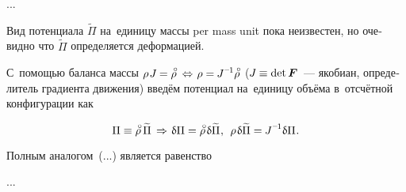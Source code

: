 ...

\begin{otherlanguage}{russian}

Вид потенциала ${\widetilde{\Pi}}$ на~единицу \hbox{массы} per mass unit пока неизвестен, но очевидно что ${\widetilde{\Pi}}$ определяется деформацией.

С~помощью баланса массы ${\rho \hspace{.2ex} J \hspace{-0.1ex} = \mathcircabove{\rho} \hspace{.5ex} \Leftrightarrow \hspace{.2ex} \rho = \hspace{-0.1ex} J^{\expminusone} \mathcircabove{\rho}}$ (${J \hspace{-0.1ex} \equiv \operatorname{det} \bm{F}\hspace{-0.12ex}}$~--- якобиан, определитель градиента движения) введём потенциал на~единицу объёма в~отсчётной конфигурации как

\nopagebreak\begin{equation}
\Pi \equiv \mathcircabove{\rho} \hspace{.4ex} \widetilde{\Pi}
\hspace{.4ex} \Rightarrow \hspace{.2ex}
\variation{\Pi} = \mathcircabove{\rho} \hspace{.25ex} \variation{\widetilde{\Pi}}
\hspace{.1ex}, \:\:
\rho \hspace{.2ex} \variation{\widetilde{\Pi}} = \hspace{-0.1ex} J^{\expminusone} \variation{\Pi} \hspace{.1ex}.
\end{equation}

Полным аналогом~(...) является равенство

...



\end{otherlanguage}



